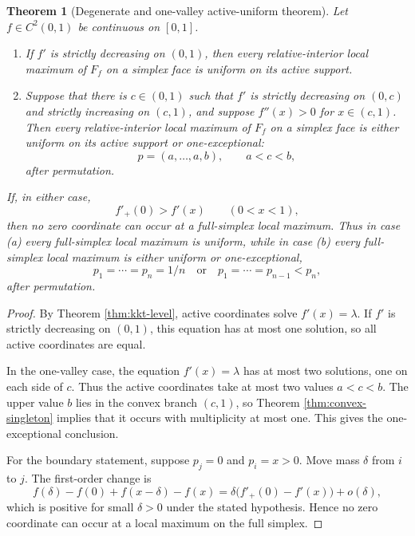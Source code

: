 \documentclass[11pt]{article}
\newtheorem{theorem}{Theorem}[section]
\theoremstyle{definition}
\begin{document}
\begin{theorem}[Degenerate and one-valley active-uniform theorem]\label{thm:one-valley}
Let $f\in C^2(0,1)$ be continuous on $[0,1]$.

\begin{enumerate}[label=\textup{(\alph*)}]
\item If $f'$ is strictly decreasing on $(0,1)$, then every relative-interior local maximum of $F_f$ on a simplex face is uniform on its active support.

\item Suppose that there is $c\in(0,1)$ such that $f'$ is strictly decreasing on $(0,c)$ and strictly increasing on $(c,1)$, and suppose $f''(x)>0$ for $x\in(c,1)$. Then every relative-interior local maximum of $F_f$ on a simplex face is either uniform on its active support or one-exceptional:
\[
  p=(a,\ldots,a,b),\qquad a<c<b,
\]
after permutation.
\end{enumerate}

If, in either case,
\[
  f'_+(0)>f'(x)\qquad (0<x<1),
\]
then no zero coordinate can occur at a full-simplex local maximum. Thus in case \textup{(a)} every full-simplex local maximum is uniform, while in case \textup{(b)} every full-simplex local maximum is either uniform or one-exceptional,
\[
  p_1=\cdots=p_n=1/n
  \quad\text{or}\quad
  p_1=\cdots=p_{n-1}<p_n,
\]
after permutation.
\end{theorem}

\begin{proof}
By Theorem \ref{thm:kkt-level}, active coordinates solve $f'(x)=\lambda$. If $f'$ is strictly decreasing on $(0,1)$, this equation has at most one solution, so all active coordinates are equal.

In the one-valley case, the equation $f'(x)=\lambda$ has at most two solutions, one on each side of $c$. Thus the active coordinates take at most two values $a<c<b$. The upper value $b$ lies in the convex branch $(c,1)$, so Theorem \ref{thm:convex-singleton} implies that it occurs with multiplicity at most one. This gives the one-exceptional conclusion.

For the boundary statement, suppose $p_j=0$ and $p_i=x>0$. Move mass $\delta$ from $i$ to $j$. The first-order change is
\[
  f(\delta)-f(0)+f(x-\delta)-f(x)
  =\delta\bigl(f'_+(0)-f'(x)\bigr)+o(\delta),
\]
which is positive for small $\delta>0$ under the stated hypothesis. Hence no zero coordinate can occur at a local maximum on the full simplex.
\end{proof}
\end{document}
